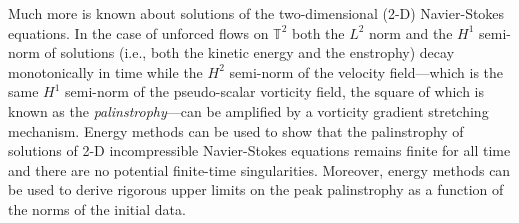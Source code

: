 \documentclass[11pt]{article}
\begin{document}
Much more is known about solutions of the two-dimensional (2-D) Navier-Stokes equations.
In the case of unforced flows on $\mathbb{T}^2$ both the $L^2$ norm and the $H^1$ semi-norm of solutions (i.e., both the kinetic energy and the enstrophy) decay monotonically in time while the $H^2$ semi-norm of the velocity field---which is the same $H^1$ semi-norm of the pseudo-scalar vorticity field, the square of which is known as the {\it palinstrophy}---can be amplified by a vorticity gradient stretching mechanism.
Energy methods can be used to show that the palinstrophy of solutions of 2-D incompressible Navier-Stokes equations remains finite for all time and there are no potential finite-time singularities.
Moreover, energy methods can be used to derive rigorous upper limits on the peak palinstrophy as a function of the norms of the initial data.
\end{document}
